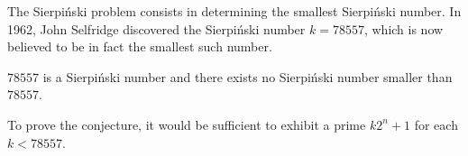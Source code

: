 \documentclass[12pt]{article}
\begin{document}
\begin{cnl}
\begin{remark}
The Sierpi\'nski problem consists in determining the smallest 
Sierpi\'nski number. In 1962, John Selfridge discovered the 
Sierpi\'nski number $k = 78557$, which is now believed to be in fact
 the smallest such number. 
\end{remark}

\begin{conjecture}
$78557$ is a Sierpi\'nski number and there exists no Sierpi\'nski 
number smaller than $78557$.
\end{conjecture}

\begin{remark}
To prove the conjecture, it would be sufficient to exhibit
a prime $k2^n+1$ for each $k < 78557$.
\end{remark}


\end{cnl}
\end{document}
